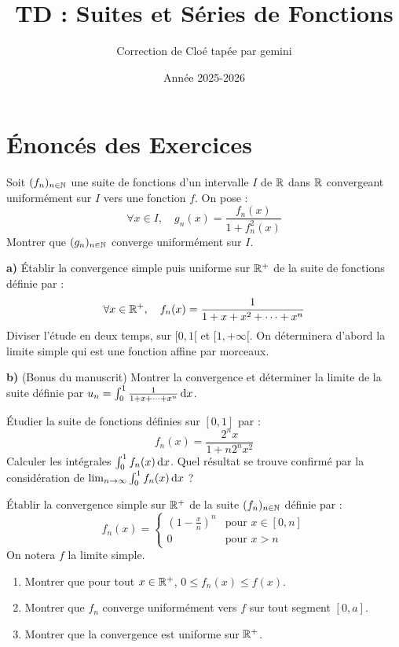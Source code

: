 \documentclass{prepacours}
\begin{document}
\title{\textbf{TD : Suites et Séries de Fonctions}}
\author{Correction de Cloé tapée par gemini}
\date{Année 2025-2026}
\maketitle

\section{Énoncés des Exercices}

\begin{exercice}
Soit $(f_n)_{n\in\mathbb{N}}$ une suite de fonctions d'un intervalle $I$ de $\mathbb{R}$ dans $\mathbb{R}$ convergeant uniformément sur $I$ vers une fonction $f$.
On pose :
$$ \forall x \in I, \quad g_n(x) = \frac{f_n(x)}{1+f_n^2(x)} $$
Montrer que $(g_n)_{n\in\mathbb{N}}$ converge uniformément sur $I$.
\end{exercice}

\begin{exercice}
\textbf{a)} Établir la convergence simple puis uniforme sur $\mathbb{R}^+$ de la suite de fonctions définie par :
$$ \forall x \in \mathbb{R}^+, \quad f_n(x) = \frac{1}{1+x+x^2+\dots+x^n} $$
Diviser l'étude en deux temps, sur $[0, 1[$ et $[1, +\infty[$. On déterminera d'abord la limite simple qui est une fonction affine par morceaux.

\textbf{b)} (Bonus du manuscrit) Montrer la convergence et déterminer la limite de la suite définie par $u_n = \int_0^1 \frac{1}{1+x+\dots+x^n} \,\mathrm{d}x$.
\end{exercice}

\begin{exercice}
Étudier la suite de fonctions définies sur $[0, 1]$ par :
$$ f_n(x) = \frac{2^n x}{1+n 2^n x^2} $$
Calculer les intégrales $\int_0^1 f_n(x) \,\mathrm{d}x$. Quel résultat se trouve confirmé par la considération de $\lim_{n\to\infty} \int_0^1 f_n(x) \,\mathrm{d}x$ ?
\end{exercice}

\begin{exercice}
Établir la convergence simple sur $\mathbb{R}^+$ de la suite $(f_n)_{n\in\mathbb{N}}$ définie par :
$$ f_n(x) = \begin{cases} (1-\frac{x}{n})^n & \text{pour } x \in [0, n] \\ 0 & \text{pour } x > n \end{cases} $$
On notera $f$ la limite simple.
\begin{enumerate}
    \item Montrer que pour tout $x \in \mathbb{R}^+$, $0 \le f_n(x) \le f(x)$.
    \item Montrer que $f_n$ converge uniformément vers $f$ sur tout segment $[0, a]$.
    \item Montrer que la convergence est uniforme sur $\mathbb{R}^+$.
\end{enumerate}
\end{exercice}
\end{document}
